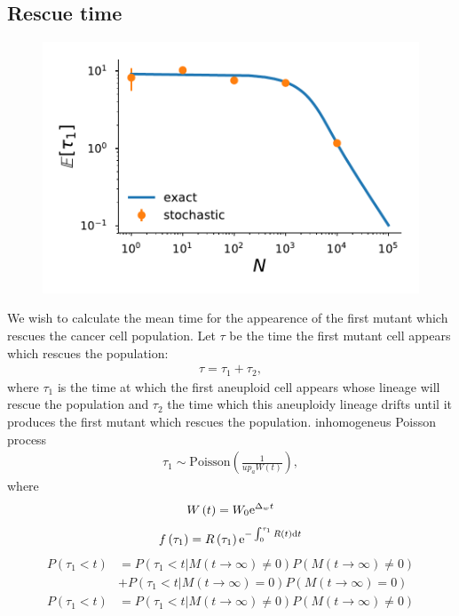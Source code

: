 \documentclass[12pt]{extarticle}
\renewcommand{\d}{{\rm d}}
\newcommand{\e}{{\rm e}}
\begin{document}
\subsection*{Rescue time}
\begin{figure}[!t]
 \vspace*{1\baselineskip}
\includegraphics[width=1\textwidth]{Figures/MeanTimeGrowthAneuploidyPlot.pdf}
\caption{}
\label{MeanTimeGrowthAneuploidyPlot}
\end{figure}
We wish to calculate the mean time for the appearence of the first mutant which rescues the cancer cell population. Let $\tau$ be the time the first mutant cell appears which rescues the population:
\begin{align}
\tau=\tau_1+\tau_2,
\end{align}
where $\tau_1$ is the time at which the first aneuploid cell appears whose lineage will rescue the population and $\tau_2$ the time which this aneuploidy lineage drifts until it produces the first mutant which rescues the population. 
inhomogeneus Poisson process
\begin{align}
\tau_1\sim \text{Poisson}\left(\frac{1}{up_aW\left(t\right)}\right),
\end{align}
where 
\begin{equation}
W\left(t\right)=W_0\e^{\Delta_wt}
\end{equation}
\begin{align}
f\left(\tau_1\right)=R\left(\tau_1\right)\e^{-\int_0^{\tau_1} R(t)\d t}
\end{align}
\begin{align*}
P\left(\tau_1<t\right)&=P\left(\tau_1<t|M\left(t\rightarrow\infty\right)\neq0\right)P\left(M\left(t\rightarrow\infty\right)\neq0\right)\\
&+P\left(\tau_1<t|M\left(t\rightarrow\infty\right)=0\right)P\left(M\left(t\rightarrow\infty\right)=0\right)\\
P\left(\tau_1<t\right)&=P\left(\tau_1<t|M\left(t\rightarrow\infty\right)\neq0\right)P\left(M\left(t\rightarrow\infty\right)\neq0\right)
\end{align*}
\end{document}
